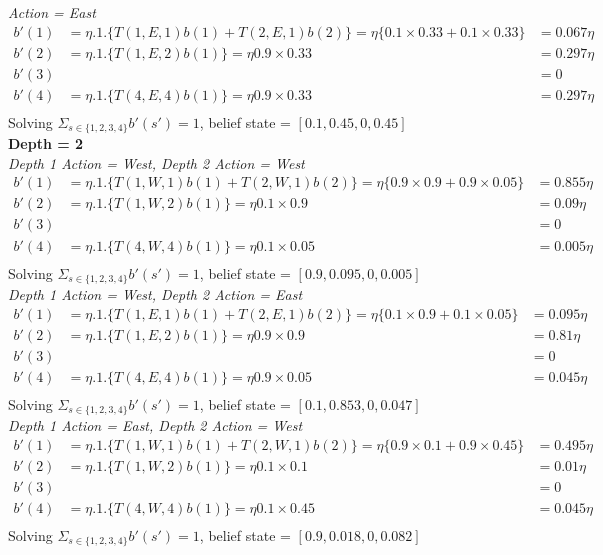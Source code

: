 \documentclass[12pt]{article}
\begin{document}
\textit{Action = East}
\begin{align}
b'(1) &= \eta.1.\{T(1,E,1)b(1) + T(2,E,1)b(2)\}=\eta\{0.1\times0.33 + 0.1\times0.33\} &= 0.067\eta \nonumber\\
b'(2) &= \eta.1.\{T(1,E,2)b(1) \}=\eta 0.9\times0.33 &= 0.297\eta \nonumber\\
b'(3) & &=0 \nonumber\\
b'(4) &= \eta.1.\{T(4,E,4)b(1) \}=\eta 0.9\times0.33 &= 0.297\eta \nonumber\\
\nonumber
\end{align}
Solving $\Sigma_{s \in \{1,2,3,4\}} b'(s')=1$, belief state = $[ 0.1,0.45,0,
0.45]$ \\

\textbf{Depth = 2}\\
\textit{Depth 1 Action = West, Depth 2 Action = West}
\begin{align}
b'(1) &= \eta.1.\{T(1,W,1)b(1) + T(2,W,1)b(2)\}=\eta\{0.9\times0.9 + 0.9\times0.05\} &= 0.855\eta \nonumber\\
b'(2) &= \eta.1.\{T(1,W,2)b(1) \}=\eta 0.1\times0.9 &= 0.09\eta \nonumber\\
b'(3) & &=0 \nonumber\\
b'(4) &= \eta.1.\{T(4,W,4)b(1) \}=\eta 0.1\times0.05 &= 0.005\eta \nonumber\\
\nonumber
\end{align}
Solving $\Sigma_{s \in \{1,2,3,4\}} b'(s')=1$, belief state = $[ 0.9,0.095,0,
0.005]$ \\

\textit{Depth 1 Action = West, Depth 2 Action = East}
\begin{align}
b'(1) &= \eta.1.\{T(1,E,1)b(1) + T(2,E,1)b(2)\}=\eta\{0.1\times0.9 + 0.1\times0.05\} &= 0.095\eta \nonumber\\
b'(2) &= \eta.1.\{T(1,E,2)b(1) \}=\eta 0.9\times0.9 &= 0.81\eta \nonumber\\
b'(3) & &=0 \nonumber\\
b'(4) &= \eta.1.\{T(4,E,4)b(1) \}=\eta 0.9\times0.05 &= 0.045\eta \nonumber\\
\nonumber
\end{align}
Solving $\Sigma_{s \in \{1,2,3,4\}} b'(s')=1$, belief state = $[ 0.1,0.853,0,
0.047]$ \\

\textit{Depth 1 Action = East, Depth 2 Action = West}
\begin{align}
b'(1) &= \eta.1.\{T(1,W,1)b(1) + T(2,W,1)b(2)\}=\eta\{0.9\times0.1 + 0.9\times0.45\} &= 0.495\eta \nonumber\\
b'(2) &= \eta.1.\{T(1,W,2)b(1) \}=\eta 0.1\times0.1 &= 0.01\eta \nonumber\\
b'(3) & &=0 \nonumber\\
b'(4) &= \eta.1.\{T(4,W,4)b(1) \}=\eta 0.1\times0.45 &= 0.045\eta \nonumber\\
\nonumber
\end{align}
Solving $\Sigma_{s \in \{1,2,3,4\}} b'(s')=1$, belief state = $[ 0.9,0.018,0,
0.082]$ \\
\end{document}
